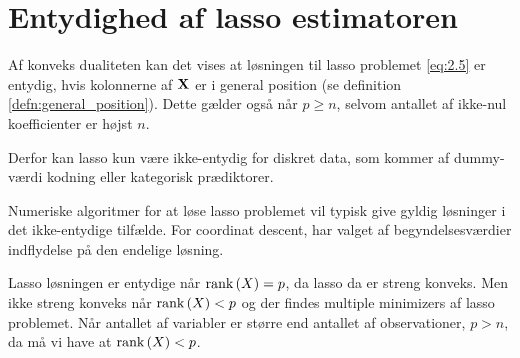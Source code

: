 \section{Entydighed af lasso estimatoren}

Af konveks dualiteten kan det vises at løsningen til lasso problemet \eqref{eq:2.5} er entydig, hvis kolonnerne af \(\mathbf{X}\) er i general position (se definition \ref{defn:general_position}).
Dette gælder også når \(p \geq n\), selvom antallet af ikke-nul koefficienter er højst \(n\).

Derfor kan lasso kun være ikke-entydig for diskret data, som kommer af dummy-værdi kodning eller kategorisk prædiktorer.

Numeriske algoritmer for at løse lasso problemet vil typisk give gyldig løsninger i det ikke-entydige tilfælde.
For coordinat descent, har valget af begyndelsesværdier indflydelse på den endelige løsning.


Lasso løsningen er entydige når \(\text{rank} \del{X}=p\), da lasso da er streng konveks.
Men ikke streng konveks når \(\text{rank} \del{X} < p\) og der findes multiple minimizers af lasso problemet.
Når antallet af variabler er større end antallet af observationer, \(p>n\), da må vi have at  \(\text{rank} \del{X} < p\).


